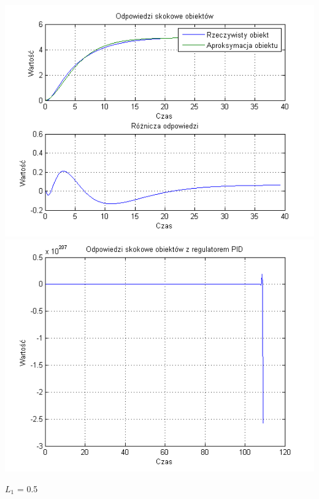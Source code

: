 \documentclass[10pt,a4paper]{article}
\begin{document}
\begin{center}
\includegraphics[scale=1]{images/dwa/skrypt_197.png}\\
\includegraphics[scale=1]{images/dwa/skrypt_198.png}\\
\end{center}
\newpage
$L_1$ = 0.5
\end{document}
